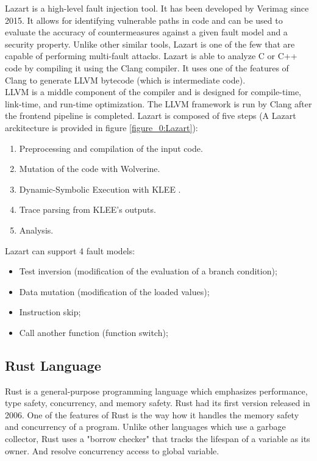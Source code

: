 Lazart \cite{Lazart2015} is a high-level fault injection tool.
It has been developed by Verimag since 2015.
It allows for identifying vulnerable paths in code and can be used to evaluate the accuracy of countermeasures against a given fault model and a security property.
Unlike other similar tools, Lazart is one of the few that are capable of performing multi-fault attacks.
Lazart is able to analyze C or C++ code by compiling it using the Clang compiler.
It uses one of the features of Clang to generate LLVM bytecode (which is intermediate code).\\
LLVM is a middle component of the compiler and is designed for compile-time, link-time, and run-time optimization.
The LLVM framework is run by Clang after the frontend pipeline is completed.
Lazart is composed of five steps (A Lazart arckitecture is provided in figure \ref{figure_0:Lazart}):
\begin{enumerate}[noitemsep,leftmargin=0em,wide]
    \item Preprocessing and compilation of the input code.
    \item Mutation of the code with Wolverine.
    \item Dynamic-Symbolic Execution with KLEE \cite{24Cadar2008KLEEUA,25kleeseKLEE}.
    \item Trace parsing from KLEE's outputs.
    \item Analysis.
\end{enumerate}

Lazart can support 4 fault models:
\begin{itemize}[noitemsep,leftmargin=0em,wide]
    \item Test inversion (modification of the evaluation of a branch condition);
    \item Data mutation (modification of the loaded values);
    \item Instruction skip;
    \item Call another function (function switch);
\end{itemize}

\subsection{Rust Language}
Rust is a general-purpose programming language which emphasizes performance, type safety, concurrency, and memory safety.
Rust had its first version released in 2006.
One of the features of Rust is the way how it handles the memory safety and concurrency of a program.
Unlike other languages which use a garbage collector, Rust uses a "borrow checker" that tracks the lifespan of a variable as its owner.
And resolve concurrency access to global variable. 

